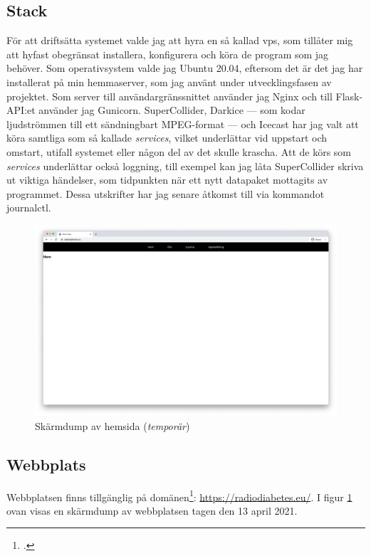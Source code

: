 \documentclass[11pt, a4paper]{article} %
\begin{document}
\subsection*{Stack}
För att driftsätta systemet valde jag att hyra en så kallad \gls{vps}, som tillåter mig att hyfast obegränsat installera, konfigurera och köra de program som jag behöver. Som operativsystem valde jag Ubuntu 20.04, eftersom det är det jag har installerat på min hemmaserver, som jag använt under utvecklingsfasen av projektet. Som server till användargränssnittet använder jag Nginx och till Flask-API:et använder jag Gunicorn. SuperCollider, Darkice --- som kodar ljudströmmen till ett sändningbart MPEG-format --- och Icecast har jag valt att köra samtliga som så kallade \emph{services}, vilket underlättar vid uppstart och omstart, utifall systemet eller någon del av det skulle krascha. Att de körs som \emph{services} underlättar också loggning, till exempel kan jag låta SuperCollider skriva ut viktiga händelser, som tidpunkten när ett nytt datapaket mottagits av programmet. Dessa utskrifter har jag senare åtkomst till via kommandot journalctl.


\begin{figure}[H]
\centering
\includegraphics[width=\textwidth]{../media/hemsida.png}
\caption{Skärmdump av hemsida (\emph{temporär})}
\label{hemsida}
\end{figure}


\subsection*{Webbplats}
Webbplatsen finns tillgänglig på domänen\footcite{jondell_radio_nodate}: \url{https://radiodiabetes.eu/}. I figur \ref{hemsida} ovan visas en skärmdump av webbplatsen tagen den 13 april 2021.
\end{document}
